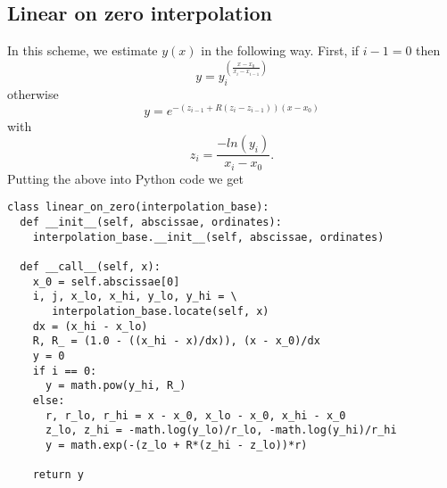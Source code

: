 \subsection{Linear on zero interpolation}
In this scheme, we estimate $y(x)$ in the following way. First, if
$i-1 = 0$ then
\begin{equation}
  y = y^{\left(\frac{x-x_{0}}{x_{i}-x_{i-1}}\right)}_{i}
\end{equation}
otherwise
\begin{equation}
  y = e^{-\left(z_{i-1} +R\left(z_{i}-z_{i-1}\right)\right)\left(x-x_{0}\right)} \label{eq:loz-linear-interpolation}
\end{equation}
with
\begin{equation}
  z_{i} = \frac{-ln(y_{i})}{x_{i}-x_{0}}.
\end{equation}
Putting the above into Python code we get
\begin{verbatim}
class linear_on_zero(interpolation_base):
  def __init__(self, abscissae, ordinates):
    interpolation_base.__init__(self, abscissae, ordinates)

  def __call__(self, x):
    x_0 = self.abscissae[0]
    i, j, x_lo, x_hi, y_lo, y_hi = \
       interpolation_base.locate(self, x)
    dx = (x_hi - x_lo)
    R, R_ = (1.0 - ((x_hi - x)/dx)), (x - x_0)/dx
    y = 0
    if i == 0:
      y = math.pow(y_hi, R_)
    else:
      r, r_lo, r_hi = x - x_0, x_lo - x_0, x_hi - x_0
      z_lo, z_hi = -math.log(y_lo)/r_lo, -math.log(y_hi)/r_hi
      y = math.exp(-(z_lo + R*(z_hi - z_lo))*r)

    return y
\end{verbatim}

